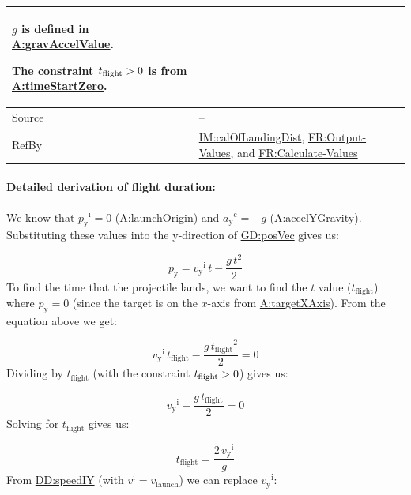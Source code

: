 \documentclass[12pt]{article}
\newcommand{\gt}{\ensuremath >}
\begin{document}
\begin{minipage}{\textwidth}
\begin{tabular}{>{\raggedright}p{}>{\raggedright\arraybackslash}p{}}
        $g$ is defined in \hyperref[gravAccelValue]{A:gravAccelValue}.
        
        The constraint ${t_{\text{flight}}}\gt{}0$ is from \hyperref[timeStartZero]{A:timeStartZero}.
        
\\ \midrule
Source & --
         
\\ \midrule
RefBy & \hyperref[IM:calOfLandingDist]{IM:calOfLandingDist}, \hyperref[outputValues]{FR:Output-Values}, and \hyperref[calcValues]{FR:Calculate-Values}
        
\\ \bottomrule
\end{tabular}
\end{minipage}

\paragraph{Detailed derivation of flight duration:}
\label{IM:calOfLandingTimeDeriv}
We know that ${{p_{\text{y}}}^{\text{i}}}=0$ (\hyperref[launchOrigin]{A:launchOrigin}) and ${{a_{\text{y}}}^{\text{c}}}=-g$ (\hyperref[accelYGravity]{A:accelYGravity}). Substituting these values into the y-direction of \hyperref[GD:posVec]{GD:posVec} gives us:

\begin{displaymath}
{p_{\text{y}}}={{v_{\text{y}}}^{\text{i}}}\,t-\frac{g\,t^{2}}{2}
\end{displaymath}
To find the time that the projectile lands, we want to find the $t$ value (${t_{\text{flight}}}$) where ${p_{\text{y}}}=0$ (since the target is on the $x$-axis from \hyperref[targetXAxis]{A:targetXAxis}). From the equation above we get:

\begin{displaymath}
{{v_{\text{y}}}^{\text{i}}}\,{t_{\text{flight}}}-\frac{g\,{t_{\text{flight}}}^{2}}{2}=0
\end{displaymath}
Dividing by ${t_{\text{flight}}}$ (with the constraint ${t_{\text{flight}}}\gt{}0$) gives us:

\begin{displaymath}
{{v_{\text{y}}}^{\text{i}}}-\frac{g\,{t_{\text{flight}}}}{2}=0
\end{displaymath}
Solving for ${t_{\text{flight}}}$ gives us:

\begin{displaymath}
{t_{\text{flight}}}=\frac{2\,{{v_{\text{y}}}^{\text{i}}}}{g}
\end{displaymath}
From \hyperref[DD:speedIY]{DD:speedIY} (with ${v^{\text{i}}}={v_{\text{launch}}}$) we can replace ${{v_{\text{y}}}^{\text{i}}}$:
\end{document}
